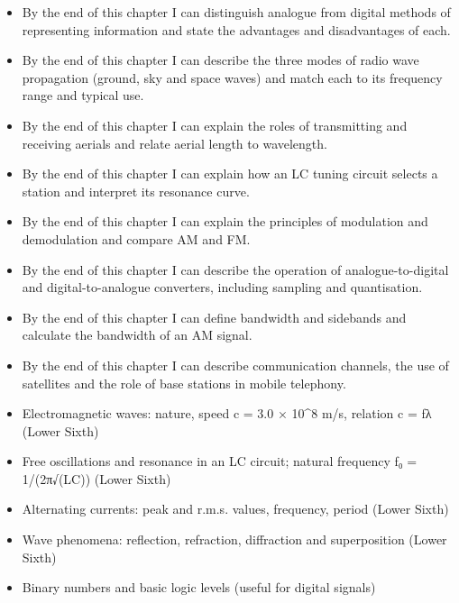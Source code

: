 \documentclass[11pt]{article}
\begin{document}
\begin{objectifs}
\begin{itemize}
\item By the end of this chapter I can distinguish analogue from digital methods of representing information and state the advantages and disadvantages of each.
\item By the end of this chapter I can describe the three modes of radio wave propagation (ground, sky and space waves) and match each to its frequency range and typical use.
\item By the end of this chapter I can explain the roles of transmitting and receiving aerials and relate aerial length to wavelength.
\item By the end of this chapter I can explain how an LC tuning circuit selects a station and interpret its resonance curve.
\item By the end of this chapter I can explain the principles of modulation and demodulation and compare AM and FM.
\item By the end of this chapter I can describe the operation of analogue-to-digital and digital-to-analogue converters, including sampling and quantisation.
\item By the end of this chapter I can define bandwidth and sidebands and calculate the bandwidth of an AM signal.
\item By the end of this chapter I can describe communication channels, the use of satellites and the role of base stations in mobile telephony.
\end{itemize}
\end{objectifs}

\begin{prerequis}
\begin{itemize}
\item Electromagnetic waves: nature, speed c = 3.0 × 10\^{}8 m/s, relation c = fλ (Lower Sixth)
\item Free oscillations and resonance in an LC circuit; natural frequency f₀ = 1/(2π√(LC)) (Lower Sixth)
\item Alternating currents: peak and r.m.s. values, frequency, period (Lower Sixth)
\item Wave phenomena: reflection, refraction, diffraction and superposition (Lower Sixth)
\item Binary numbers and basic logic levels (useful for digital signals)
\end{itemize}
\end{prerequis}
\end{document}
